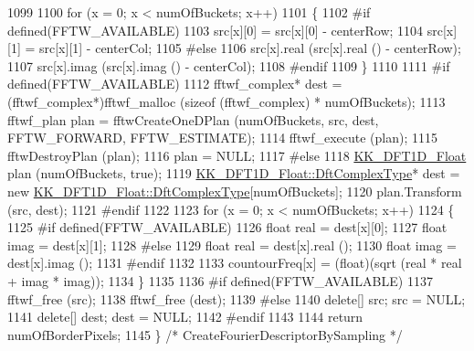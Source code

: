 \begin{DoxyCode}
1099 
1100   \textcolor{keywordflow}{for}  (x = 0;  x < numOfBuckets;  x++)
1101   \{
1102 \textcolor{preprocessor}{    #if  defined(FFTW\_AVAILABLE)}
1103       src[x][0] = src[x][0] - centerRow;
1104       src[x][1] = src[x][1] - centerCol;
1105 \textcolor{preprocessor}{    #else}
1106       src[x].real (src[x].real () - centerRow);
1107       src[x].imag (src[x].imag () - centerCol);
1108 \textcolor{preprocessor}{    #endif}
1109   \}
1110 
1111 \textcolor{preprocessor}{  #if  defined(FFTW\_AVAILABLE)}
1112     fftwf\_complex*  dest = (fftwf\_complex*)fftwf\_malloc (\textcolor{keyword}{sizeof} (fftwf\_complex) * numOfBuckets);
1113     fftwf\_plan  plan = fftwCreateOneDPlan (numOfBuckets, src, dest, FFTW\_FORWARD, FFTW\_ESTIMATE);
1114     fftwf\_execute (plan);
1115     fftwDestroyPlan (plan);
1116     plan = NULL;
1117 \textcolor{preprocessor}{  #else}
1118     \hyperlink{class_k_k_b_1_1_k_k___d_f_t1_d}{KK\_DFT1D\_Float}  plan (numOfBuckets, \textcolor{keyword}{true});
1119     \hyperlink{class_k_k_b_1_1_k_k___d_f_t1_d_a4cbc827157dd30ddec2d3753e552a827}{KK\_DFT1D\_Float::DftComplexType}*  dest = \textcolor{keyword}{new} 
      \hyperlink{class_k_k_b_1_1_k_k___d_f_t1_d_a4cbc827157dd30ddec2d3753e552a827}{KK\_DFT1D\_Float::DftComplexType}[numOfBuckets];
1120     plan.Transform (src, dest);
1121 \textcolor{preprocessor}{  #endif}
1122 
1123   \textcolor{keywordflow}{for}  (x = 0;  x < numOfBuckets;  x++)
1124   \{
1125 \textcolor{preprocessor}{    #if  defined(FFTW\_AVAILABLE)}
1126       \textcolor{keywordtype}{float} real = dest[x][0];
1127       \textcolor{keywordtype}{float} imag = dest[x][1];
1128 \textcolor{preprocessor}{    #else}
1129       \textcolor{keywordtype}{float} real = dest[x].real ();
1130       \textcolor{keywordtype}{float} imag = dest[x].imag ();
1131 \textcolor{preprocessor}{    #endif}
1132 
1133     countourFreq[x] = (float)(sqrt (real * real + imag * imag));
1134   \}
1135 
1136 \textcolor{preprocessor}{  #if  defined(FFTW\_AVAILABLE)}
1137     fftwf\_free (src);
1138     fftwf\_free (dest);
1139 \textcolor{preprocessor}{  #else}
1140     \textcolor{keyword}{delete}[]  src;   src  = NULL;
1141     \textcolor{keyword}{delete}[]  dest;  dest = NULL;
1142 \textcolor{preprocessor}{  #endif}
1143 
1144   \textcolor{keywordflow}{return}  numOfBorderPixels;
1145 \}  \textcolor{comment}{/* CreateFourierDescriptorBySampling */}
\end{DoxyCode}
